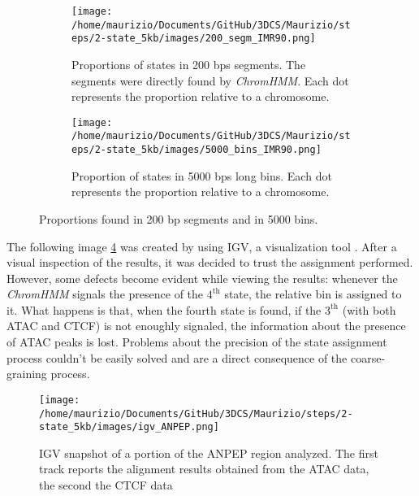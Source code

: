 \begin{figure}[H]
  \centering
  \begin{subfigure}[t]{0.40\textwidth}
    \texttt{[image: /home/maurizio/Documents/GitHub/3DCS/Maurizio/steps/2-state\_5kb/images/200\_segm\_IMR90.png]}
    \caption{Proportions of states in 200 bps segments. The segments were directly found by \textit{ChromHMM}. Each dot represents the proportion relative to a chromosome.}
    \label{fig: proportions in segments}
  \end{subfigure}
  \begin{subfigure}[t]{0.40\textwidth}
      \texttt{[image: /home/maurizio/Documents/GitHub/3DCS/Maurizio/steps/2-state\_5kb/images/5000\_bins\_IMR90.png]}
      \caption{Proportion of states in 5000 bps long bins. Each dot represents the proportion relative to a chromosome.}
      \label{fig: proportions in bins}
  \end{subfigure}
  \caption{Proportions found in 200 bp segments and in 5000 bins.}
  \label{fig: proportions bins and steps}
\end{figure}


The following image \ref{fig: ANPEP igv} was created by using IGV, a visualization tool
\cite{robinsonIgvJsEmbeddable2020a,robinsonIntroductionIntegrativeGenomics}
. After a visual inspection of the results, it was decided to trust the assignment performed. However, some defects become evident while viewing the results: whenever the \textit{ChromHMM} signals the presence of the $4^{\text{th}}$ state, the relative bin is assigned to it. What happens is that, when the fourth state is found, if the $3^{\text{th}}$ (with both ATAC and CTCF) is not enoughly signaled, the information about the presence of ATAC peaks is lost. Problems about the precision of the state assignment process couldn't be easily solved and are a direct consequence of the coarse-graining process.

\begin{figure}[H]
  \centering
  \texttt{[image: /home/maurizio/Documents/GitHub/3DCS/Maurizio/steps/2-state\_5kb/images/igv\_ANPEP.png]}
  \caption{IGV snapshot of a portion of the ANPEP region analyzed. The first track reports the alignment results obtained from the ATAC data, the second the CTCF data}
  \label{fig: ANPEP igv}
\end{figure}
